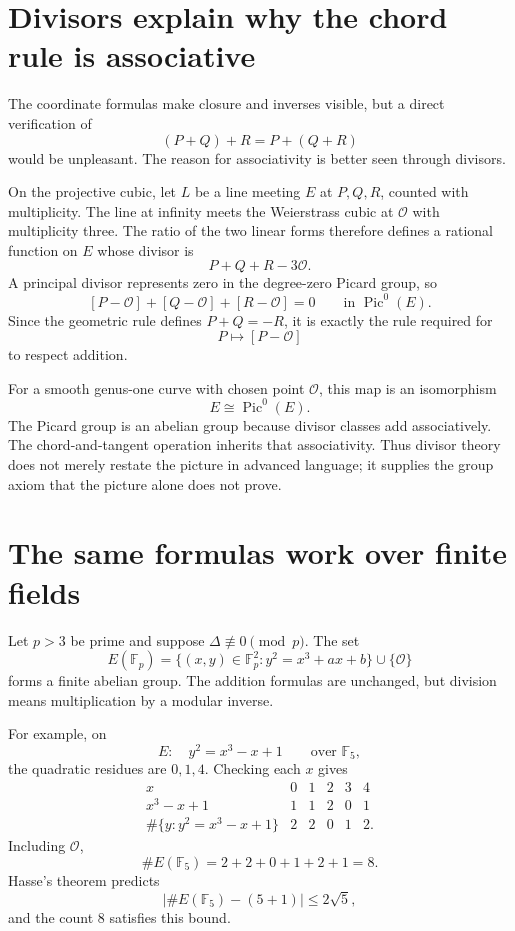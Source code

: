 \section{Divisors explain why the chord rule is associative}

The coordinate formulas make closure and inverses visible, but a direct verification of
\[
  (P+Q)+R=P+(Q+R)
\]
would be unpleasant.  The reason for associativity is better seen through divisors.

On the projective cubic, let \(L\) be a line meeting \(E\) at \(P,Q,R\), counted with multiplicity.  The line at infinity meets the Weierstrass cubic at \(\mathcal O\) with multiplicity three.  The ratio of the two linear forms therefore defines a rational function on \(E\) whose divisor is
\[
  P+Q+R-3\mathcal O.
\]
A principal divisor represents zero in the degree-zero Picard group, so
\[
  [P-\mathcal O]+[Q-\mathcal O]+[R-\mathcal O]=0
  \qquad\text{in }\operatorname{Pic}^0(E).
\]
Since the geometric rule defines \(P+Q=-R\), it is exactly the rule required for
\[
  P\longmapsto[P-\mathcal O]
\]
to respect addition.

For a smooth genus-one curve with chosen point \(\mathcal O\), this map is an isomorphism
\[
  E\cong\operatorname{Pic}^0(E).
\]
The Picard group is an abelian group because divisor classes add associatively.  The chord-and-tangent operation inherits that associativity.  Thus divisor theory does not merely restate the picture in advanced language; it supplies the group axiom that the picture alone does not prove.

\section{The same formulas work over finite fields}

Let \(p>3\) be prime and suppose \(\Delta\not\equiv0\pmod p\).  The set
\[
  E(\mathbb F_p)
  =\{(x,y)\in\mathbb F_p^2:y^2=x^3+ax+b\}
  \cup\{\mathcal O\}
\]
forms a finite abelian group.  The addition formulas are unchanged, but division means multiplication by a modular inverse.

For example, on
\[
  E:\quad y^2=x^3-x+1
  \qquad\text{over }\mathbb F_5,
\]
the quadratic residues are \(0,1,4\).  Checking each \(x\) gives
\[
\begin{array}{c|ccccc}
  x&0&1&2&3&4\\ \hline
  x^3-x+1&1&1&2&0&1\\
  \#\{y:y^2=x^3-x+1\}&2&2&0&1&2.
\end{array}
\]
Including \(\mathcal O\),
\[
  \#E(\mathbb F_5)=2+2+0+1+2+1=8.
\]
Hasse's theorem predicts
\[
  \bigl|\#E(\mathbb F_5)-(5+1)\bigr|
  \le2\sqrt5,
\]
and the count \(8\) satisfies this bound.

